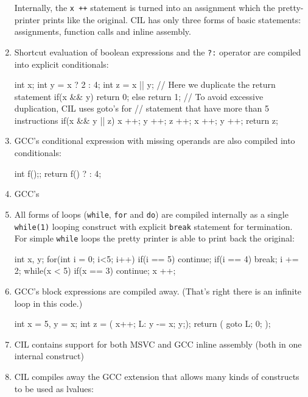 \documentclass{article}
\def\t#1{{\tt #1}}
\begin{document}
\begin{enumerate}
 Internally, the \t{x ++} statement is turned into an assignment which the
pretty-printer prints like the original. CIL has only three forms of basic
statements: assignments, function calls and inline assembly.

\item Shortcut evaluation of boolean expressions and the \t{?:} operator are
compiled into explicit conditionals:
\begin{cilcode}[local]
  int x;
  int y = x ? 2 : 4;
  int z = x || y;
  // Here we duplicate the return statement
  if(x && y) { return 0; } else { return 1; }
  // To avoid excessive duplication, CIL uses goto's for 
  // statement that have more than 5 instructions
  if(x && y || z) { x ++; y ++; z ++; x ++; y ++; return z; }
\end{cilcode}

\item GCC's conditional expression with missing operands are also compiled
into conditionals:
\begin{cilcode}[local]
  int f();;
  return f() ? : 4;
\end{cilcode}

\item GCC's 

\item All forms of loops (\t{while}, \t{for} and \t{do}) are compiled
internally as a single \t{while(1)} looping construct with explicit \t{break}
statement for termination. For simple \t{while} loops the pretty printer is
able to print back the original:
\begin{cilcode}[local]
   int x, y;
   for(int i = 0; i<5; i++) {
      if(i == 5) continue;
      if(i == 4) break;
      i += 2;
   } 
   while(x < 5) {
     if(x == 3) continue;
     x ++;
   }
\end{cilcode}

\item GCC's block expressions are compiled away. (That's right there is an
infinite loop in this code.)

\begin{cilcode}[local]
   int x = 5, y = x;
   int z = ({ x++; L: y -= x; y;});
   return ({ goto L; 0; });
\end{cilcode}

\item CIL contains support for both MSVC and GCC inline assembly (both in one
internal construct)

\item CIL compiles away the GCC extension that allows many kinds of constructs
to be used as lvalues:


\end{enumerate}
\end{document}

